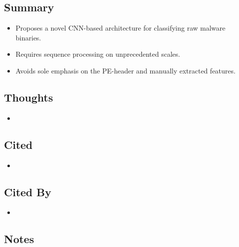 \documentclass{article}
\begin{document}
\subsection*{Summary}
\begin{itemize}
\item Proposes a novel CNN-based architecture for classifying raw malware binaries.
\item Requires sequence processing on unprecedented scales.
\item Avoids sole emphasis on the PE-header and manually extracted features.
\end{itemize}

\subsection*{Thoughts}
\begin{itemize}
\item
\end{itemize}

\subsection*{Cited}
\begin{itemize}
\item
\end{itemize}

\subsection*{Cited By}
\begin{itemize}
\item
\end{itemize}

\subsection*{Notes}
\end{document}
